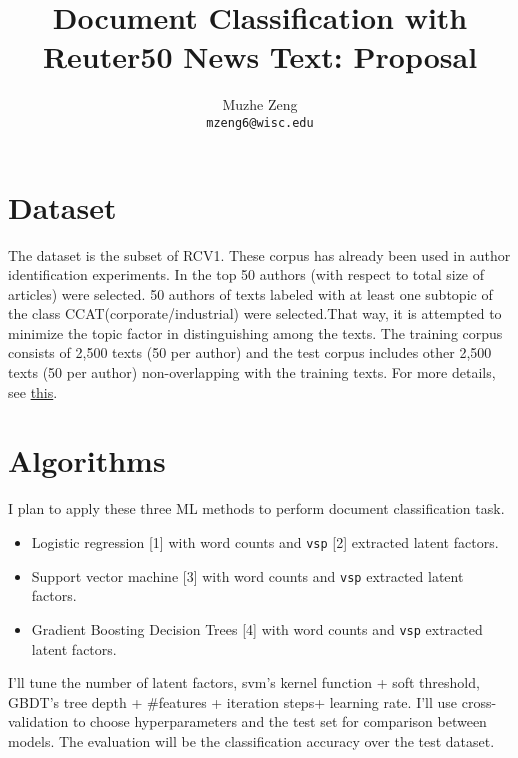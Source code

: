 \documentclass{article}
\title{Document Classification with Reuter50 News Text: Proposal}
\author{
Muzhe Zeng\\
\texttt{mzeng6@wisc.edu} 
}
\begin{document}


\maketitle


\section{Dataset}
The dataset is the subset of RCV1. These corpus has already been used in author identification experiments. In the top 50 authors (with respect to total size of articles) were selected. 50 authors of texts labeled with at least one subtopic of the class CCAT(corporate/industrial) were selected.That way, it is attempted to minimize the topic factor in distinguishing among the texts. The training corpus consists of 2,500 texts (50 per author) and the test corpus includes other 2,500 texts (50 per author) non-overlapping with the training texts. For more details, see \href{https://archive.ics.uci.edu/ml/datasets/Reuter_50_50}{this}. 


\section{Algorithms}
I plan to apply these three ML methods to perform document classification task. 
\begin{itemize}
\item Logistic regression [1] with word counts and \texttt{vsp} [2] extracted latent factors.
\item Support vector machine [3] with word counts and \texttt{vsp} extracted latent factors. 
\item Gradient Boosting Decision Trees [4] with word counts and \texttt{vsp} extracted latent factors. 
\end{itemize}
I'll tune the number of latent factors, svm's kernel function + soft threshold, GBDT's tree depth + \#features + iteration steps+ learning rate. I'll use cross-validation to choose hyperparameters and the test set for comparison between models. The evaluation will be the classification accuracy over the test dataset.
\end{document}

